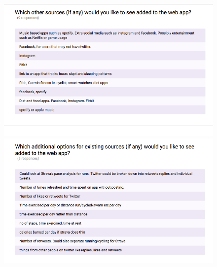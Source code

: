 \documentclass[11pt,openright,a4paper]{report}
\begin{document}
\begin{appendices}
\begin{figure}[ht]
  \centering
  \includegraphics[width=.9\textwidth]{i/testingresponses14.png}
  \includegraphics[width=.9\textwidth]{i/testingresponses15.png}
\end{figure}

\end{appendices}
\end{document}
